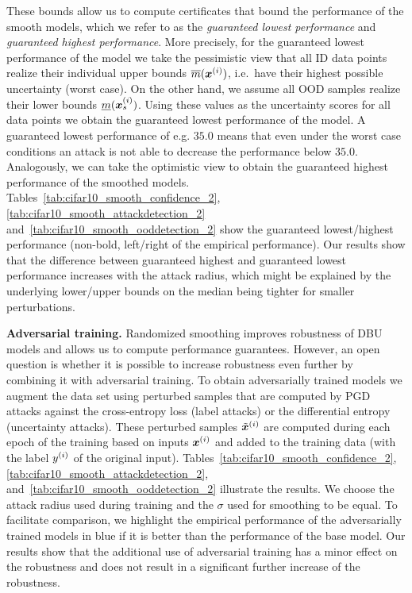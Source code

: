 These bounds allow us to compute certificates that bound the performance of the smooth models, which we refer to as the \emph{guaranteed lowest performance} and \emph{guaranteed highest performance}. More precisely, for the guaranteed lowest performance of the model we take the pessimistic view that all ID data points realize their individual upper bounds $\overline{m}({\bm{x}}^{(i)})$, i.e.\ have their highest possible uncertainty (worst case). On the other hand, we assume all OOD samples realize their lower bounds $\underline{m}({\bm{x}}^{(i)}_s)$. Using these values as the uncertainty scores for all data points we obtain the guaranteed lowest performance of the model. 
A guaranteed lowest performance of e.g. $35.0$ means that even under the worst case conditions an attack is not able to decrease the performance below $35.0$. 
Analogously, we can take the optimistic view to obtain the guaranteed highest performance of the smoothed models. 
%
Tables~\ref{tab:cifar10_smooth_confidence_2}, \ref{tab:cifar10_smooth_attackdetection_2} and~\ref{tab:cifar10_smooth_ooddetection_2} show the guaranteed lowest/highest performance (non-bold, left/right of the empirical performance). 
Our results show that the difference between guaranteed highest and guaranteed lowest performance increases with the attack radius, which might be explained by the underlying lower/upper bounds on the median being tighter for smaller perturbations. 
%


\textbf{Adversarial training.}
Randomized smoothing improves robustness of DBU models and allows us to compute performance guarantees. However, an open question is whether it is possible to increase robustness even further by combining it with adversarial training. To obtain adversarially trained models we augment the data set using perturbed samples that are computed by PGD attacks against the cross-entropy loss (label attacks) or the differential entropy (uncertainty attacks). These perturbed samples $\tilde{{\bm{x}}}^{(i)}$ are computed during each epoch of the training based on inputs ${\bm{x}}^{(i)}$ and added to the training data (with the label $y^{(i)}$ of the original input). 
Tables~\ref{tab:cifar10_smooth_confidence_2}, \ref{tab:cifar10_smooth_attackdetection_2}, and~\ref{tab:cifar10_smooth_ooddetection_2} illustrate the results. We choose the attack radius used during training and the $\sigma$ used for smoothing to be equal. %
To facilitate comparison, we highlight the empirical performance of the adversarially trained models in blue if it is better than the performance of the base model. Our results show that the additional use of adversarial training has a minor effect on the robustness and does not result in a significant further increase of the robustness. 

